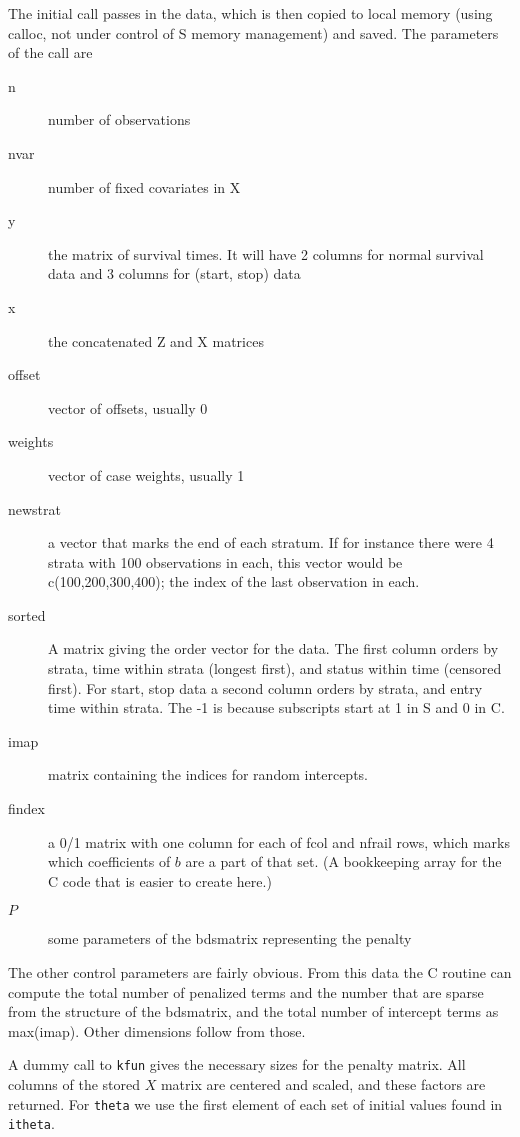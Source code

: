 \documentclass{article}
\begin{document}
The initial call passes in the data, which is then copied to
local memory (using calloc, not under control of S memory
management) and saved.  The parameters of the call are
\begin{description}
  \item[n] number of observations
  \item[nvar] number of fixed covariates in X 
  \item[y] the matrix of survival times.  It will have 2 columns for normal
    survival data and 3 columns for (start, stop) data
  \item[x] the concatenated Z and X matrices
  \item[offset] vector of offsets, usually 0
  \item[weights] vector of case weights, usually 1
  \item[newstrat] a vector that marks the end of each stratum.  If for 
    instance there were 4 strata with 100 observations in each, this vector
    would be c(100,200,300,400); the index of the last observation in each.
  \item[sorted] A matrix giving the order vector for the data.  The first 
    column orders by strata, time within strata (longest first), and status
    within time (censored first).  For start, stop data a second column orders
    by strata, and entry time within strata. The -1 is because subscripts 
    start at 1 in S and 0 in C.
  \item[imap] matrix containing the indices for random intercepts.  
  \item[findex] a 0/1 matrix with one column for each of fcol and nfrail
    rows, which marks which coefficients of $b$ are a part of that set.
    (A bookkeeping array for the C code that is easier to create here.)
  \item[$P$] some parameters of the bdsmatrix representing the penalty  
\end{description}
The other control parameters are fairly obvious.  From this data the C
routine can compute the total number of penalized terms and the number that
are sparse from the structure of the bdsmatrix, and the total number of
intercept terms as max(imap).  Other dimensions follow from those.

A dummy call to \Verb!kfun! gives the necessary sizes for the penalty matrix.
All columns of the stored $X$ matrix are centered and scaled, and these
factors are returned.  
For \Verb!theta! we use the first element of each set of initial values found
in \Verb!itheta!.
\end{document}
